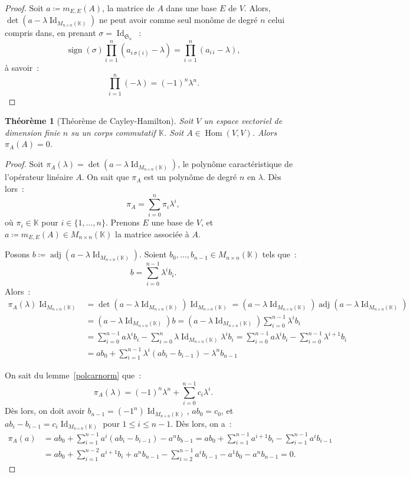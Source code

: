 \documentclass{article}
\DeclareMathOperator{\Id}{Id}
\DeclareMathOperator{\sign}{sign}
\DeclareMathOperator{\Hom}{Hom}
\DeclareMathOperator{\adj}{adj}
\newcommand{\K}{\mathbb K}
\newcommand{\M}[3]{M_{#1 \times #2}(#3)}
\newcommand{\Perm}{\mathfrak{S}}
\newtheorem{thm}{Théorème}[section]
\theoremstyle{definition}
\theoremstyle{remark}
\begin{document}
		\begin{proof} Soit $a \coloneqq m_{E, E}(A)$, la matrice de $A$ dans une base $E$ de $V$. Alors, $\det(a - \lambda\Id_{\M nn\K})$ ne peut avoir comme seul
		monôme de degré $n$ celui compris dans, en prenant $\sigma = \Id_{\Perm_n}$~:
		\[\sign(\sigma)\prod_{i=1}^n(a_{i\,\sigma(i)} - \lambda) = \prod_{i=1}^n(a_{i\,i} - \lambda),\]
		à savoir~: \[\prod_{i=1}^n(-\lambda) = (-1)^n\lambda^n.\] \end{proof}

		\begin{thm}[Théorème de Cayley-Hamilton]\label{Cayley-Hamilton} Soit $V$ un espace vectoriel de dimension finie $n$ su un corps commutatif $\K$. Soit
		$A \in \Hom(V, V)$. Alors $\pi_A(A) = 0$. \end{thm}

		\begin{proof} Soit $\pi_A(\lambda) = \det(a - \lambda\Id_{\M nn\K})$, le polynôme caractéristique de l'opérateur linéaire $A$. On sait que $\pi_A$ est un
		polynôme de degré $n$ en $\lambda$. Dès lors~:
		\[\pi_A = \sum_{i=0}^n\pi_i\lambda^i,\]
		où $\pi_i \in \K$ pour $i \in \{1, \dotsc, n\}$. Prenons $E$ une base de $V$, et $a \coloneqq m_{E, E}(A) \in \M nn\K$ la matrice associée à $A$.

		Posons $b \coloneqq \adj(a - \lambda\Id_{\M nn\K})$. Soient $b_0, \dotsc, b_{n-1} \in \M nn\K$ tels que~: \[b = \sum_{i=0}^{n-1}\lambda^ib_i.\]
		Alors~:
		\[\begin{aligned}
			\pi_A(\lambda)\Id_{\M nn\K} &= \det(a - \lambda\Id_{\M nn\K})\Id_{\M nn\K} = (a - \lambda\Id_{\M nn\K})\adj(a - \lambda\Id_{\M nn\K}) \\
			                            &= (a - \lambda\Id_{\M nn\K})b = (a - \lambda\Id_{\M nn\K})\sum_{i=0}^{n-1}\lambda^ib_i \\
			                            &= \sum_{i=0}^{n-1}a\lambda^ib_i - \sum_{i=0}^n\lambda\Id_{\M nn\K}\lambda^ib_i
			                            = \sum_{i=0}^{n-1}a\lambda^ib_i - \sum_{i=0}^{n-1}\lambda^{i+1}b_i \\
										&= ab_0 + \sum_{i=1}^{n-1}\lambda^i(ab_i - b_{i-1}) - \lambda^nb_{n-1}
		\end{aligned}\]

		On sait du lemme~\ref{polcarnorm} que~: \[\pi_A(\lambda) = (-1)^n\lambda^n + \sum_{i=0}^{n-1}c_i\lambda^i.\]
		Dès lors, on doit avoir $b_{n-1} = (-1^n)\Id_{\M nn\K}$, $ab_0 = c_0$, et $ab_i - b_{i-1} = c_i\Id_{\M nn\K}$ pour $1 \leq i \leq n-1$. Dès lors, on a~:
		\[\begin{aligned}
			\pi_A(a) &= ab_0 + \sum_{i=1}^{n-1}a^i(ab_i-b_{i-1}) - a^nb_{b-1} = ab_0 + \sum_{i=1}^{n-1}a^{i+1}b_i - \sum_{i=1}^{n-1}a^ib_{i-1} \\
			         &= ab_0 + \sum_{i=1}^{n-2}a^{i+1}b_i + a^{n}b_{n-1} - \sum_{i=2}^{n-1}a^ib_{i-1} - a^1b_0 - a^nb_{n-1} = 0.
		\end{aligned}\]
		\end{proof}
\end{document}
